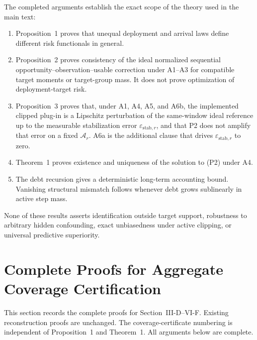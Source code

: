 The completed arguments establish the exact scope of the theory used in
the main text:

\begin{enumerate}
    \item Proposition~1 proves that unequal deployment and arrival laws define
    different risk functionals in general.
    \item Proposition~2 proves consistency of the ideal normalized sequential
    opportunity--observation--usable correction under A1--A3 for compatible
    target moments or target-group mass.  It does not prove optimization of
    deployment-target risk.
    \item Proposition~3 proves that, under A1, A4, A5, and A6b, the implemented
    clipped plug-in is a Lipschitz perturbation of the same-window ideal
    reference up to the measurable stabilization error
    $\varepsilon_{\mathrm{stab},r}$, and that P2 does not amplify that error on
    a fixed $\mathcal{A}_r$.  A6a is the additional clause that drives
    $\varepsilon_{\mathrm{stab},r}$ to zero.
    \item Theorem~1 proves existence and uniqueness of the solution to (P2)
    under A4.
    \item The debt recursion gives a deterministic long-term accounting bound.
    Vanishing structural mismatch follows whenever debt grows sublinearly in
    active step mass.
\end{enumerate}

None of these results asserts identification outside target support, robustness
to arbitrary hidden confounding, exact unbiasedness under active clipping, or
universal predictive superiority.


\section{Complete Proofs for Aggregate Coverage Certification}
\label{app:agg_coverage_proofs}

This section records the complete proofs for
Section~\mbox {III-D}--\mbox {VI-F}.
Existing reconstruction proofs are unchanged.  The coverage-certificate
numbering is independent of Proposition~1 and
Theorem~1.  All arguments below are complete.

